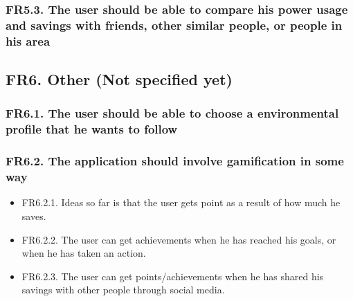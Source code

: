 \subsubsection{FR5.3. The user should be able to compare his power usage and savings with friends, other similar people, or people in his area}

\subsection{FR6. Other (Not specified yet)}
\subsubsection{FR6.1. The user should be able to choose a environmental profile that he wants to follow}
\subsubsection{FR6.2. The application should involve gamification in some way}
\begin{itemize}
\item FR6.2.1. Ideas so far is that the user gets point as a result of how much he saves.
\item FR6.2.2. The user can get achievements when he has reached his goals, or when he has taken an action.
\item FR6.2.3. The user can get points/achievements when he has shared his savings with other people through social media.
\end{itemize}